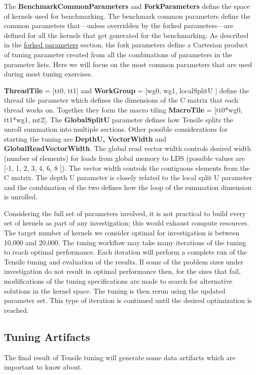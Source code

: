 \documentclass[]{article}
\begin{document}
The  {\color{ForestGreen} \bf BenchmarkCommonParameters} and  {\color{ForestGreen} \bf ForkParameters} define the space of kernels used for benchmarking. The benchmark common parameters define the common parameters that---unless overridden by the forked parameters---are defined for all the kernels that get generated for the benchmarking. As described in the \hyperref[sec:forkParams]{forked parameters} section, the fork parameters define a Cartesian product of tuning parameter created from all the combinations of parameters in the parameter lists. Here we will focus on the most common parameters that are used during most tuning exercises.

{\color{ForestGreen} \bf ThreadTile} = [tt0, tt1] and {\color{ForestGreen} \bf  WorkGroup} = [wg0, wg1, localSplitU ] define the thread tile parameter which defines the dimensions of the C matrix that each thread works on. Together they form the macro tiling {\color{ForestGreen} \bf MacroTile} = [tt0*wg0, tt1*wg1, mt2]. The {\color{ForestGreen} \bf GlobalSplitU} parameter defines how Tensile splits the unroll summation into multiple sections. Other possible considerations for starting the tuning are {\color{ForestGreen} \bf DepthU, VectorWidth} and {\color{ForestGreen} \bf GlobalReadVectorWidth}. The global read vector width controls desired width (number of elements) for loads from global memory to LDS (possible values are [-1, 1, 2, 3, 4, 6, 8 ]). The vector width controls the contiguous elements from the C matrix. The depth U parameter is closely related to the local split U parameter and the combination of the two defines how the loop of the summation dimension is unrolled.

Considering the full set of parameters involved, it is not practical to build every set of kernels as part of any investigation; this would exhaust compute resources. The target number of kernels we consider optimal for investigation is between 10,000 and 20,000. The tuning workflow may take many iterations of the tuning to reach optimal performance. Each iteration will perform a complete run of the Tensile tuning and evaluation of the results. If some of the problem sizes under investigation do not result in optimal performance then, for the sizes that fail, modifications of the tuning specifications are made to search for alternative solutions in the kernel space. The tuning is then rerun using the updated parameter set. This type of iteration is continued until the desired optimization is reached.

\subsection{Tuning Artifacts}
The final result of Tensile tuning will generate some data artifacts which are important to know about.
\end{document}
